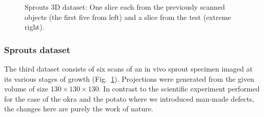 \documentclass[journal]{IEEEtran}
\begin{document}
\begin{figure}[!h]
\begin{subfigure}[b]{0.29\linewidth}
\captionsetup{labelformat=empty}
        \caption{}
     \end{subfigure}
      \caption{Sprouts 3D dataset: One slice each from the previously scanned objects (the first five from left) and a slice from the test (extreme
        right).}
\label{fig:object-prior_test_sprouts}
\addtolength{\textfloatsep}{-0.8cm}
\end{figure}
\subsubsection{\textbf{Sprouts dataset}}
\label{Sec:sprouts}
The third dataset consists of six scans of an in vivo
sprout specimen imaged at its various stages of growth
(Fig.~\ref{fig:object-prior_test_sprouts}). Projections were generated from the given volume of size $130\times130\times130$. In contrast to the scientific
experiment performed for the case of the okra and the potato where we
introduced man-made defects, the changes here are purely the work of
nature. %
\end{document}
